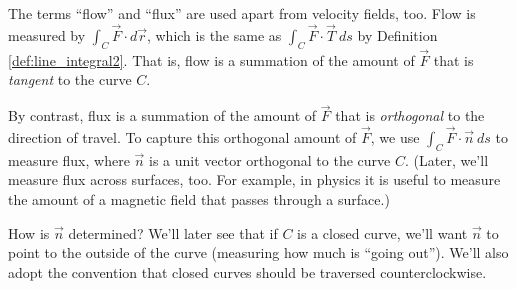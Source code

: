 The terms ``flow'' and ``flux'' are used apart from velocity fields, too. Flow is measured by $\int_C \vec F\cdot d\vec r$, which is the same as $\int_C \vec F\cdot\vec T\ ds$ by Definition \ref{def:line_integral2}. That is, flow is a summation of the amount of $\vec F$ that is \emph{tangent} to the curve $C$. %

By contrast, flux is a summation of the amount of $\vec F$ that is \emph{orthogonal} to the direction of travel. To capture this orthogonal amount of $\vec F$, we use $\int_C \vec F \cdot \vec n\ ds$ to measure flux, where $\vec n$ is a unit vector orthogonal to the curve $C$. %
(Later, we'll measure flux across surfaces, too. %
For example, in physics it is useful to measure the amount of a magnetic field that passes through a surface.)


%

How is $\vec n$ determined? We'll later see that if $C$ is a closed curve, we'll want $\vec n$ to point to the outside of the curve (measuring how much is ``going out''). We'll also adopt the convention that closed curves should be traversed counterclockwise. 

